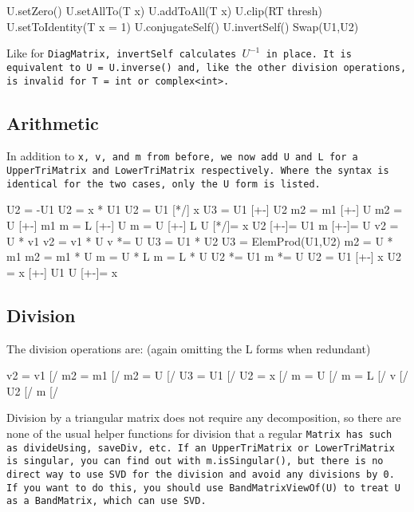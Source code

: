 \begin{tmvcode}
U.setZero()
U.setAllTo(T x)
U.addToAll(T x)
U.clip(RT thresh)
U.setToIdentity(T x = 1)
U.conjugateSelf()
U.invertSelf()
Swap(U1,U2)
\end{tmvcode}
Like for \tt{DiagMatrix}, \tt{invertSelf} calculates $U^{-1}$ in place.  
It is equivalent to \tt{U = U.inverse()} and, like the other division operations, is invalid for \tt{T = int} or \tt{complex<int>}.
\vspace{12pt}

\subsection{Arithmetic}
\label{TriMatrix_Arithmetic}

In addition to \tt{x}, \tt{v}, and \tt{m} from before, 
we now add \tt{U} and \tt{L} for a \tt{UpperTriMatrix}
and \tt{LowerTriMatrix} respectively.  Where the syntax is identical
for the two cases, only the \tt{U} form is listed.

\begin{tmvcode}
U2 = -U1
U2 = x * U1
U2 = U1 [*/] x
U3 = U1 [+-] U2
m2 = m1 [+-] U
m2 = U [+-] m1
m = L [+-] U
m = U [+-] L
U [*/]= x
U2 [+-]= U1
m [+-]= U
v2 = U * v1
v2 = v1 * U
v *= U
U3 = U1 * U2
U3 = ElemProd(U1,U2)
m2 = U * m1
m2 = m1 * U
m = U * L
m = L * U
U2 *= U1
m *= U
U2 = U1 [+-] x
U2 = x [+-] U1
U [+-]= x
\end{tmvcode}

\subsection{Division}
\label{TriMatrix_Division}

The division operations are: (again omitting the L forms when redundant)
\begin{tmvcode}
v2 = v1 [/%
m2 = m1 [/%
m2 = U [/%
U3 = U1 [/%
U2 = x [/%
m = U [/%
m = L [/%
v [/%
U2 [/%
m [/%
\end{tmvcode}
Division by a triangular matrix does not require any decomposition, so there are none of the usual helper functions for division that a regular \tt{Matrix} has such as \tt{divideUsing}, \tt{saveDiv}, etc.
If an \tt{UpperTriMatrix} or \tt{LowerTriMatrix} is singular, you can find out with \tt{m.isSingular()},
but there is no direct way to use SVD for the division and avoid any
divisions by 0.  If you want to do this, you should use \tt{BandMatrixViewOf(U)} to 
treat \tt{U} as a \tt{BandMatrix}, which can use SVD.

